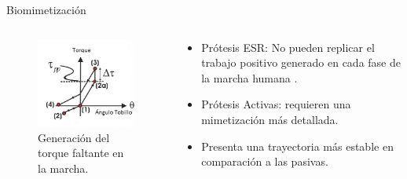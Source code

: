 \documentclass[10pt]{beamer}
\begin{document}
\begin{frame}{Biomimetización}

\begin{columns}[t]


\column{65 mm}
\begin{block}{}
{\footnotesize{}}

\begin{figure}
\begin{centering}
\includegraphics[scale=0.52]{Feathergraphics/cinneticatobillo3}
\par\end{centering}
\caption{{\scriptsize{}Generación del torque faltante en la marcha. \cite{Au2009} }}
\end{figure}

\end{block}

\column{50 mm}
\begin{exampleblock}{}

\begin{itemize}
\item {\footnotesize{}Prótesis ESR: No pueden replicar el trabajo positivo
generado en cada fase de la marcha humana \cite{Esposito2015}.}{\footnotesize \par}
\end{itemize}
\vspace{2 mm}
\begin{itemize}
\item {\footnotesize{}Prótesis Activas: requieren una mimetización más
detallada\cite{Hill2013a}.}{\footnotesize \par}
\end{itemize}
\vspace{2 mm}
\begin{itemize}
\item {\footnotesize{}Presenta una trayectoria más estable en comparación
a las pasivas\cite{Hill2013a}.}{\footnotesize \par}
\end{itemize}
\end{exampleblock}
\end{columns}

\end{frame}
\end{document}

